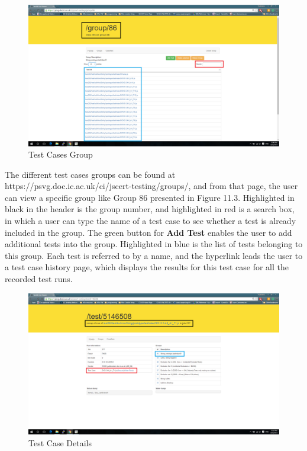 \documentclass[a4paper,11pt,twoside]{report}
\begin{document}
\begin{figure}[h!]
  \caption{Test Cases Group}
  \includegraphics[width=1.0\textwidth]{group_testing_screen_boxed}
\end{figure}

The different test cases groups can be found at https://psvg.doc.ic.ac.uk/ci/jscert-testing/groups/, and from that page, the user can view a specific group like Group 86 presented in Figure 11.3. Highlighted in black in the header is the group number, and highlighted in red is a search box, in which a user can type the name of a test case to see whether a test is already included in the group. The green button for \textbf{Add Test} enables the user to add additional tests into the group. Highlighted in blue is the list of tests belonging to this group. Each test is referred to by a name, and the hyperlink leads the user to a test case history page, which displays the results for this test case for all the recorded test runs. 

\begin{figure}[h!]
  \caption{Test Case Details}
  \includegraphics[width=1.0\textwidth]{test_case_testing_screen_boxed}
\end{figure}
\end{document}
